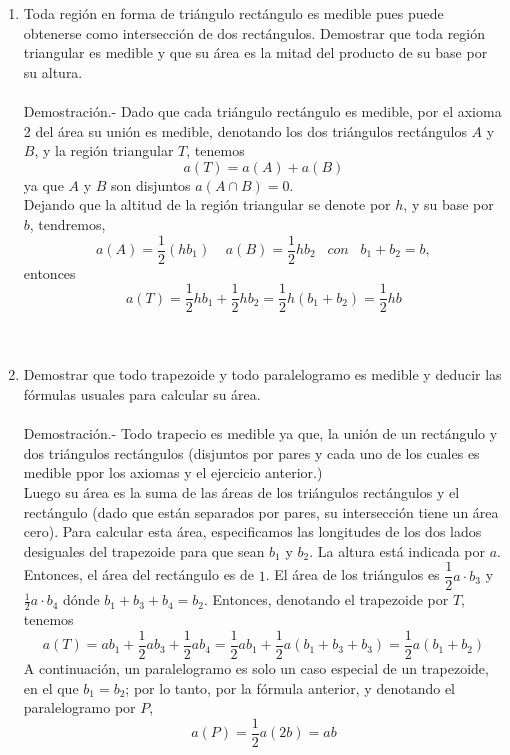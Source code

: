 \begin{enumerate}[ \bfseries 1.]
\begin{enumerate}[\bfseries (a)]
	    \end{enumerate}

	\item Toda región en forma de triángulo rectángulo es medible pues puede obtenerse como intersección de dos rectángulos. Demostrar que toda región triangular es medible y que su área es la mitad del producto de su base por su altura.\\\\
	    Demostración.-\; Dado que cada triángulo rectángulo es medible, por el axioma 2 del área su unión es medible, denotando los dos triángulos rectángulos $A$ y $B$, y la región triangular $T$, tenemos $$a(T)=a(A)+a(B)$$ ya que  $A$ y $B$ son disjuntos $a(A\cap B)=0$.\\
	    Dejando que la altitud de la región triangular se denote por $h$, y su base por $b$, tendremos,
	    $$a(A)=\dfrac{1}{2}(hb_1)\;\;\;\; a(B)=\dfrac{1}{2}hb_2 \;\;\; con \;\;\; b_1+b_2=b,$$ entonces $$a(T)=\dfrac{1}{2}hb_1+ \dfrac{1}{2}hb_2=\dfrac{1}{2}h(b_1+b_2)=\dfrac{1}{2}hb$$\\\\

	\item Demostrar que todo trapezoide y todo paralelogramo es medible y deducir las fórmulas usuales para calcular su área.\\\\
	    Demostración.-\; Todo trapecio es medible ya que, la unión de un rectángulo y dos triángulos rectángulos (disjuntos por pares y cada uno de los cuales es medible ppor los axiomas y el ejercicio anterior.)\\
	    Luego su área es la suma de las áreas de los triángulos rectángulos y el rectángulo (dado que están separados por pares, su intersección tiene un área cero). Para calcular esta área, especificamos las longitudes de los dos lados desiguales del trapezoide para que sean $b_1$ y $b_2$. La altura está indicada por $a$. Entonces, el área del rectángulo es de $1$. El área de los triángulos es $\dfrac{1}{2} a \cdot b_3$ y $\frac{1}{2} a \cdot b_4$ dónde $b_1 + b_3 + b_4 = b_2$. Entonces, denotando el trapezoide por $T$, tenemos $$a(T)=ab_1+\dfrac{1}{2}ab_3 + \dfrac{1}{2}ab_4=\dfrac{1}{2}ab_1 + \dfrac{1}{2}a(b_1 + b_3 + b_3)=\dfrac{1}{2}a(b_1+b_2)$$ A continuación, un paralelogramo es solo un caso especial de un trapezoide, en el que $b_1 = b_2$; por lo tanto, por la fórmula anterior, y denotando el paralelogramo por $P$, $$a(P)=\dfrac{1}{2}a(2b)=ab$$\\\\


\end{enumerate}
